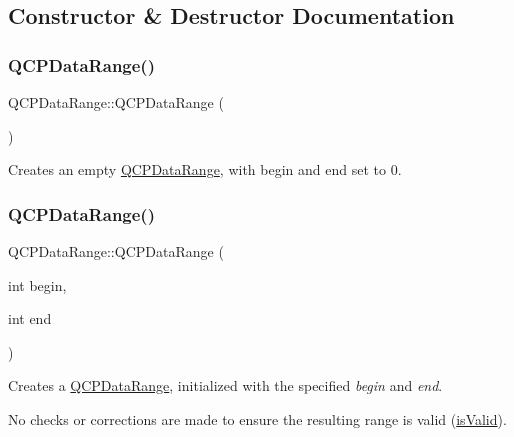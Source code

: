 \subsection{Constructor \& Destructor Documentation}
\mbox{\label{class_q_c_p_data_range_a49e72fd9bace1da9d875136dcc04c986}} 
\subsubsection{\texorpdfstring{Q\+C\+P\+Data\+Range()}{QCPDataRange()}\hspace{0.1cm}{\footnotesize\ttfamily [1/2]}}
{\footnotesize\ttfamily Q\+C\+P\+Data\+Range\+::\+Q\+C\+P\+Data\+Range (\begin{DoxyParamCaption}{ }\end{DoxyParamCaption})}

Creates an empty \mbox{\hyperlink{class_q_c_p_data_range}{Q\+C\+P\+Data\+Range}}, with begin and end set to 0. \mbox{\label{class_q_c_p_data_range_a6c7f4a3684210423270515403060e9cf}} 
\subsubsection{\texorpdfstring{Q\+C\+P\+Data\+Range()}{QCPDataRange()}\hspace{0.1cm}{\footnotesize\ttfamily [2/2]}}
{\footnotesize\ttfamily Q\+C\+P\+Data\+Range\+::\+Q\+C\+P\+Data\+Range (\begin{DoxyParamCaption}\item[{int}]{begin,  }\item[{int}]{end }\end{DoxyParamCaption})}

Creates a \mbox{\hyperlink{class_q_c_p_data_range}{Q\+C\+P\+Data\+Range}}, initialized with the specified {\itshape begin} and {\itshape end}.

No checks or corrections are made to ensure the resulting range is valid (\mbox{\hyperlink{class_q_c_p_data_range_aae53a37472212dca0a7939963e20dba0}{is\+Valid}}). 

